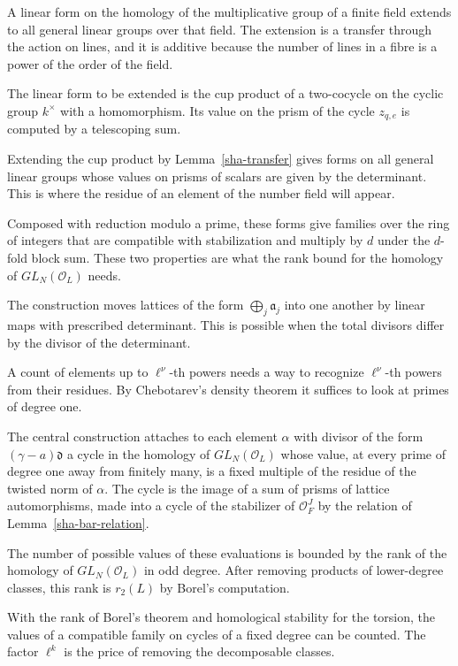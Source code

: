 A linear form on the homology of the multiplicative group of a finite field extends to all general linear groups over that field. The extension is a transfer through the action on lines, and it is additive because the number of lines in a fibre is a power of the order of the field.

The linear form to be extended is the cup product of a two-cocycle on the cyclic group $k^\times$ with a homomorphism. Its value on the prism of the cycle $z_{q,e}$ is computed by a telescoping sum.

Extending the cup product by Lemma~\ref{sha-transfer} gives forms on all general linear groups whose values on prisms of scalars are given by the determinant. This is where the residue of an element of the number field will appear.

Composed with reduction modulo a prime, these forms give families over the ring of integers that are compatible with stabilization and multiply by $d$ under the $d$-fold block sum. These two properties are what the rank bound for the homology of $GL_N(\mathcal O_L)$ needs.

The construction moves lattices of the form $\bigoplus_j\mathfrak a_j$ into one another by linear maps with prescribed determinant. This is possible when the total divisors differ by the divisor of the determinant.

A count of elements up to $\ell^\nu$-th powers needs a way to recognize $\ell^\nu$-th powers from their residues. By Chebotarev's density theorem it suffices to look at primes of degree one.

The central construction attaches to each element $\alpha$ with divisor of the form $(\gamma-a)\mathfrak d$ a cycle in the homology of $GL_N(\mathcal O_L)$ whose value, at every prime of degree one away from finitely many, is a fixed multiple of the residue of the twisted norm of $\alpha$. The cycle is the image of a sum of prisms of lattice automorphisms, made into a cycle of the stabilizer of $\mathcal O_F^J$ by the relation of Lemma~\ref{sha-bar-relation}.

The number of possible values of these evaluations is bounded by the rank of the homology of $GL_N(\mathcal O_L)$ in odd degree. After removing products of lower-degree classes, this rank is $r_2(L)$ by Borel's computation.

With the rank of Borel's theorem and homological stability for the torsion, the values of a compatible family on cycles of a fixed degree can be counted. The factor $\ell^k$ is the price of removing the decomposable classes.

